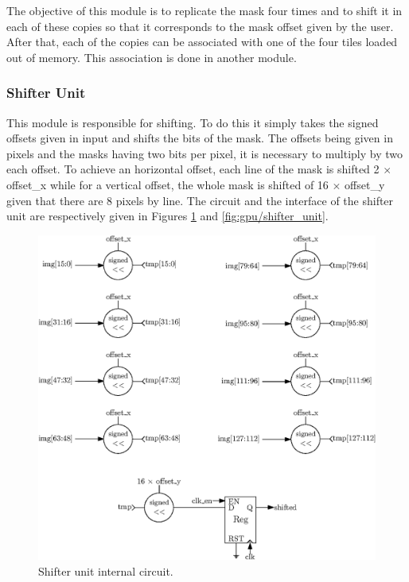The objective of this module is to replicate the mask four times and to shift it in each of these 
copies so that it corresponds to the mask offset given by the user. After that, each of the copies 
can be associated with one of the four tiles loaded out of memory. This association is done in 
another module.

\subsubsection*{Shifter Unit}

This module is responsible for shifting. To do this it simply takes the signed 
offsets given in input and shifts the bits of the mask. The offsets being given in pixels and the
masks having two bits per pixel, it is necessary to multiply by two each offset. To achieve an 
horizontal offset, each line of the mask is shifted 2 $\times$ offset\_x while for a vertical offset, the whole mask is shifted of 16 $\times$ offset\_y given that there are 8 pixels 
by line. The circuit and the interface of the shifter unit are respectively given in Figures
\ref{fig:gpu/shifter_unit_in} and \ref{fig:gpu/shifter_unit}.

\begin{figure}[H]
    \centering
    \includegraphics[width=\linewidth]{Chapter4-GPU_CLKU/res/shifter_unit_in}
    \caption{Shifter unit internal circuit.}
    \label{fig:gpu/shifter_unit_in}
\end{figure}

